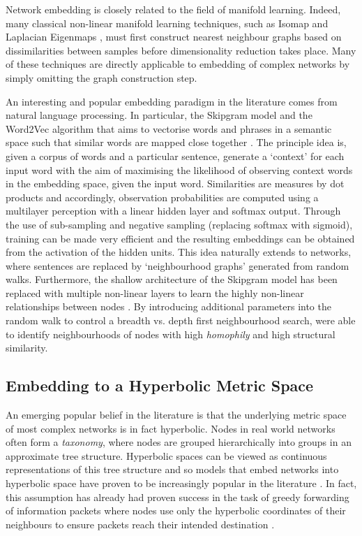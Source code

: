 \documentclass{report}
\begin{document}
	Network embedding is closely related to the field of manifold learning. Indeed, many classical non-linear manifold learning techniques, such as Isomap \cite{tenenbaum2000global} and Laplacian Eigenmaps \cite{belkin2002laplacian}, must first construct nearest neighbour graphs based on dissimilarities between samples before dimensionality reduction takes place. Many of these techniques are directly applicable to embedding of complex networks by simply omitting the graph construction step.

	An interesting and popular embedding paradigm in the literature comes from natural language processing. In particular, the Skipgram model and the Word2Vec algorithm that aims to vectorise words and phrases in a semantic space such that similar words are mapped close together \cite{mikolov2013distributed,mikolov2013efficient}. The principle idea is, given a corpus of words and a particular sentence, generate a `context' for each input word with the aim of maximising the likelihood of observing context words in the embedding space, given the input word. Similarities are measures by dot products and accordingly, observation probabilities are computed using a multilayer perception with a linear hidden layer and softmax output. Through the use of sub-sampling and negative sampling (replacing softmax with sigmoid), training can be made very efficient and the resulting embeddings can be obtained from the activation of the hidden units. This idea naturally extends to networks, where sentences are replaced by `neighbourhood graphs' generated from random walks. Furthermore, the shallow architecture of the Skipgram model has been replaced with multiple non-linear layers to learn the highly non-linear relationships between nodes \cite{tang2015line,perozzi2014deepwalk}. By introducing additional parameters into the random walk to control a breadth vs. depth first neighbourhood search, \cite{grover2016node2vec} were able to identify neighbourhoods of nodes with high \textit{homophily} and high structural similarity. 
	
	\subsection{Embedding to a Hyperbolic Metric Space}
	
	An emerging popular belief in the literature is that the underlying metric space of most complex networks is in fact hyperbolic. Nodes in real world networks often form a \textit{taxonomy}, where nodes are grouped hierarchically into groups in an approximate tree structure. Hyperbolic spaces can be viewed as continuous representations of this tree structure and so models that embed networks into hyperbolic space have proven to be increasingly popular in the literature \cite{krioukov2009curvature,krioukov2010hyperbolic}. In fact, this assumption has already had proven success in the task of greedy forwarding of information packets where nodes use only the hyperbolic coordinates of their neighbours to ensure packets reach their intended destination \cite{papadopoulos2010greedy}. 
	
\end{document}
